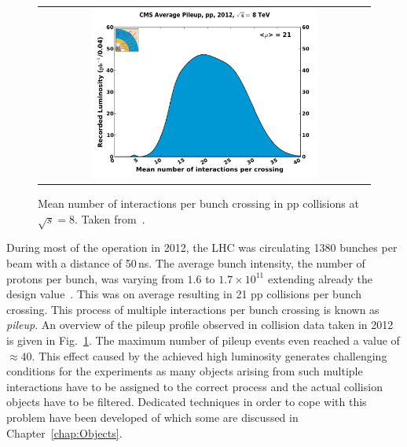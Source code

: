 \begin{figure}[!tp]
  \centering
  \begin{tabular}{c}
    \includegraphics[width=0.7\textwidth]{figures/pileup_pp_2012.pdf} 
  \end{tabular}
  \caption{Mean number of interactions per bunch crossing in pp collisions at $\sqrt{s} = 8$\tev. Taken from~\cite{bib:lhc:lumi12}.}
  \label{fig:lhc_pileup}
\end{figure}
During most of the operation in 2012, the LHC was circulating 1380 bunches per beam with a distance of 50\,ns. The average bunch intensity, \ie the number of protons per bunch, was varying from $1.6$ to $1.7 \times 10^{11}$ extending already the design value~\cite{bib:lhc:lumi12, Lamont:2013cma}. This was on average resulting in 21 pp collisions per bunch crossing. This process of multiple interactions per bunch crossing is known as \textit{pileup}. An overview of the pileup profile observed in collision data taken in 2012 is given in Fig.~\ref{fig:lhc_pileup}. The maximum number of pileup events even reached a value of $\approx 40$. This effect caused by the achieved high luminosity generates challenging conditions for the experiments as many objects arising from such multiple interactions have to be assigned to the correct process and the actual collision objects have to be filtered. Dedicated techniques in order to cope with this problem have been developed of which some are discussed in Chapter~\ref{chap:Objects}.

